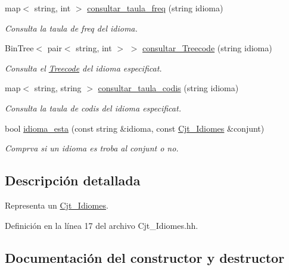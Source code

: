 \begin{DoxyCompactItemize}
map$<$ string, int $>$ \hyperlink{class_cjt___idiomes_a10390ac35850d05a28d06dbf6a3deb4f}{consultar\+\_\+taula\+\_\+freq} (string idioma)
\begin{DoxyCompactList}\small\item\em Consulta la taula de freq del idioma. \end{DoxyCompactList}\item 
Bin\+Tree$<$ pair$<$ string, int $>$ $>$ \hyperlink{class_cjt___idiomes_a2bf21a96cdbba804d53a097c42fe3b93}{consultar\+\_\+\+Treecode} (string idioma)
\begin{DoxyCompactList}\small\item\em Consulta el \hyperlink{class_treecode}{Treecode} del idioma especificat. \end{DoxyCompactList}\item 
map$<$ string, string $>$ \hyperlink{class_cjt___idiomes_af8497129cf6b3b094e6f26a0c030c785}{consultar\+\_\+taula\+\_\+codis} (string idioma)
\begin{DoxyCompactList}\small\item\em Consulta la taula de codis del idioma especificat. \end{DoxyCompactList}\item 
bool \hyperlink{class_cjt___idiomes_a699b46fae0fb902952cc5cad27604928}{idioma\+\_\+esta} (const string \&idioma, const \hyperlink{class_cjt___idiomes}{Cjt\+\_\+\+Idiomes} \&conjunt)
\begin{DoxyCompactList}\small\item\em Comprva si un idioma es troba al conjunt o no. \end{DoxyCompactList}\end{DoxyCompactItemize}


\subsection{Descripción detallada}
Representa un \hyperlink{class_cjt___idiomes}{Cjt\+\_\+\+Idiomes}. 

Definición en la línea 17 del archivo Cjt\+\_\+\+Idiomes.\+hh.



\subsection{Documentación del constructor y destructor}
\mbox{\label{class_cjt___idiomes_af77cbc534e3e83142a818314f5c24ae3}} 
